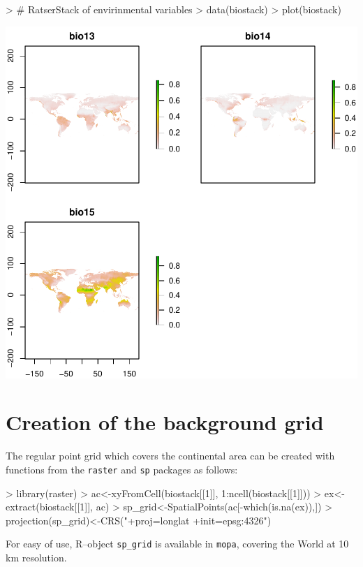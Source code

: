 \documentclass[10pt,a4paper]{article}
\begin{document}
\begin{Schunk}
\begin{Sinput}
> # RatserStack of envirinmental variables
> data(biostack)
> plot(biostack)
\end{Sinput}
\end{Schunk}
\includegraphics{mopa-mopa3}


\section{Creation of the background grid}

The regular point grid which covers the continental area can be created with functions from the \texttt{raster} and \texttt{sp} packages as follows:

\begin{Schunk}
\begin{Sinput}
> library(raster)
> ac<-xyFromCell(biostack[[1]],  1:ncell(biostack[[1]]))
> ex<-extract(biostack[[1]], ac)
> sp_grid<-SpatialPoints(ac[-which(is.na(ex)),])
> projection(sp_grid)<-CRS("+proj=longlat +init=epsg:4326")
\end{Sinput}
\end{Schunk}

For easy of use, R--object \texttt{sp\_grid} is available in \texttt{mopa}, covering the World at 10 km resolution.
\end{document}

